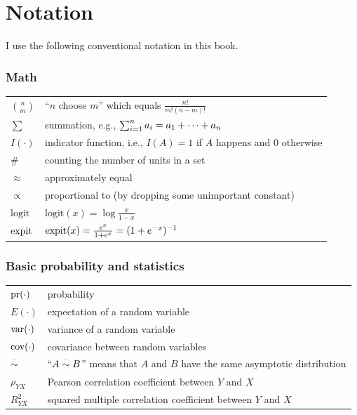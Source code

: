 \chapter*{Notation}


I use the following conventional notation in this book.


\subsection*{Math}

\begin{tabular}{ll}
\hline 
$\binom{n}{m}$ & ``$n$ choose $m$'' which equals $\frac{n!}{m!(n-m)!}$ \\
$\sum$ & summation, e.g., $\sum_{i=1}^n a_i = a_1 + \cdots + a_n$ \\
$I(\cdot)$ & indicator function, i.e.,  $I(A)=1$ if $A$ happens and 0 otherwise\\
$\#$ & counting the number of units in a set\\
$\approx$ & approximately equal \\
$\propto$ & proportional to (by dropping some unimportant constant) \\
$\text{logit}$ &  $\text{logit}(x) = \log \frac{x}{1-x}$ \\
$\textup{expit}$ & $\textup{expit}(x) =   \frac{e^x}{1+e^x} =  (1 + e^{-x})^{-1}$ \\
\hline 
\end{tabular}

\subsection*{Basic probability and statistics}

\begin{tabular}{ll}
\hline 
$\textup{pr}(\cdot)$ & probability \\
$E(\cdot)$ & expectation of a random variable\\
$\textup{var}(\cdot)$ & variance of a random variable \\
$\textup{cov}(\cdot)$ & covariance between random variables\\
$\stackrel{\cdot}{\sim}$ & ``$A \stackrel{\cdot}{\sim} B$'' means that $A$ and $B$ have the same asymptotic distribution\\
$\rho_{YX}$ & Pearson correlation coefficient between $Y$ and $X$ \\
$R^2_{YX}$ & squared multiple correlation coefficient between $Y$ and $X$ \\
\hline 
\end{tabular}


